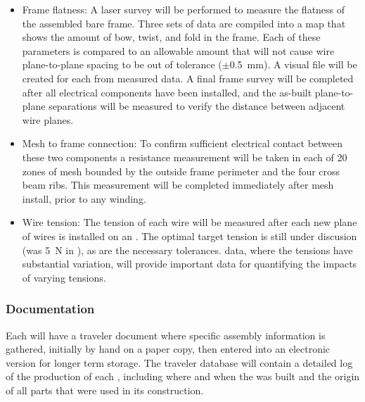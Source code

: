 \begin{itemize}

\item Frame flatness: A laser survey will be performed to measure the flatness of the assembled bare frame. Three sets of data are compiled into a map that shows the amount of bow, twist, and fold in the frame. Each of these parameters is compared to an allowable amount that will not cause wire plane-to-plane spacing to be out of tolerance ($\pm$\SI{0.5}{mm}).  A visual file will be created for each  from measured data. A final frame survey will be completed after all electrical components have been installed, and the as-built plane-to-plane separations will be measured to verify the distance between adjacent wire planes.

\item Mesh to frame connection: To confirm sufficient electrical contact between these two components a resistance measurement will be taken in each of \num{20} zones of mesh bounded by the outside frame perimeter and the four cross beam ribs. This measurement will be completed immediately after mesh install, prior to any winding.

\item Wire tension: The tension of each wire will be measured after each new plane of wires is installed on an . The optimal target tension is still under discusion (was \SI{5}{N} in ), as are the necessary tolerances.   data, where the tensions have substantial variation, will provide important data for quantifying the impacts of varying tensions.  

\end{itemize}


\subsubsection{Documentation} 

Each  will have a traveler document where specific assembly information is gathered, initially by hand on a paper copy, then entered into an electronic version for longer term storage.  The traveler database will contain a detailed log of the production of each , including where and when the  was built and the origin of all parts that were used in its construction. 

